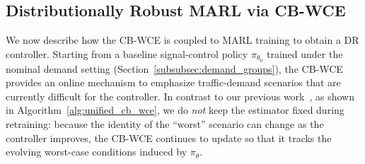 \documentclass[lettersize,journal]{IEEEtran}
\begin{document}





\subsection{Distributionally Robust MARL via CB-WCE}
\label{subsec:drmarl}

We now describe how the CB-WCE is coupled to MARL training to obtain a DR controller. Starting from a baseline signal-control policy $\pi_{\theta_0}$ trained under the nominal demand setting (Section~\ref{subsubsec:demand_groups}), the CB-WCE provides an online mechanism to emphasize traffic-demand scenarios that are currently difficult for the controller. In contrast to our previous work~\cite{pei2025distributionally}, as shown in Algorithm~\ref{alg:unified_cb_wce}, we do \emph{not} keep the estimator fixed during retraining: because the identity of the ``worst'' scenario can change as the controller improves, the CB-WCE continues to update so that it tracks the evolving worst-case conditions induced by $\pi_\theta$.
\end{document}
